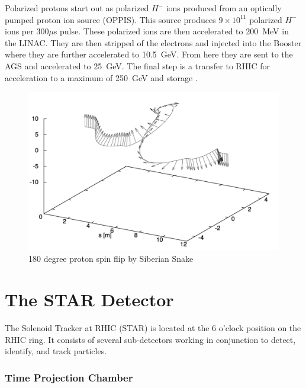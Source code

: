\documentclass[letterpaper, abstract = on,listof=totoc, bibliography=totoc]{scrreprt}
\begin{document}
Polarized protons start out as polarized $H^-$ ions produced from an optically pumped proton ion source (OPPIS).  This source produces $9\times 10^{11}$ polarized $H^-$ ions per 300$\mu$s pulse. These polarized ions are then accelerated to 200~MeV in the LINAC. They are then stripped of the electrons and injected into the Booster where they are further accelerated to 10.5~GeV. From here they are sent to the AGS and accelerated to 25~GeV. The final step is a transfer to RHIC for acceleration to a maximum of 250~GeV and storage \cite{ppCollider}.
\begin{figure}
\begin{center}
\includegraphics[width = 1\textwidth]{spinFlipFromPaper}
\caption[Spin flip by Siberian Snake]{180 degree proton spin flip by Siberian Snake}
\label{fig:spinFlip}
\end{center}
\end{figure}



\FloatBarrier

\section{The STAR Detector}
The Solenoid Tracker at RHIC (STAR) is located at the 6 o'clock position on the RHIC ring. It consists of several sub-detectors working in conjunction to detect, identify, and track particles. 

\subsubsection[TPC]{Time Projection Chamber}
\end{document}

